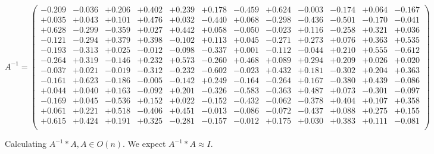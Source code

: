 \documentclass[9pt]{article}
\theoremstyle{plain}
\theoremstyle{definition}
\theoremstyle{remark}
\numberwithin{equation}{section}
\begin{document}
$A^{-1} = \left(
\begin{array}{
cccccccccccc}
-0.209 & -0.036 & +0.206 & +0.402 & +0.239 & +0.178 & -0.459 & +0.624 & -0.003 & -0.174 & +0.064 & -0.167 \\
+0.035 & +0.043 & +0.101 & +0.476 & +0.032 & -0.440 & +0.068 & -0.298 & -0.436 & -0.501 & -0.170 & -0.041 \\
+0.628 & -0.299 & -0.359 & +0.027 & +0.442 & +0.058 & -0.050 & -0.023 & +0.116 & -0.258 & +0.321 & +0.036 \\
-0.121 & -0.294 & +0.379 & +0.398 & -0.102 & +0.113 & +0.045 & -0.271 & +0.273 & +0.076 & +0.363 & +0.535 \\
-0.193 & -0.313 & +0.025 & -0.012 & -0.098 & -0.337 & +0.001 & -0.112 & -0.044 & +0.210 & +0.555 & -0.612 \\
-0.264 & +0.319 & -0.146 & +0.232 & +0.573 & -0.260 & +0.468 & +0.089 & +0.294 & +0.209 & +0.026 & +0.020 \\
-0.037 & +0.021 & -0.019 & -0.312 & -0.232 & -0.602 & -0.023 & +0.432 & +0.181 & -0.302 & +0.204 & +0.363 \\
-0.161 & +0.623 & -0.186 & -0.005 & -0.142 & +0.249 & -0.164 & -0.264 & +0.167 & -0.380 & +0.439 & -0.086 \\
+0.044 & +0.040 & +0.163 & -0.092 & +0.201 & -0.326 & -0.583 & -0.363 & +0.487 & +0.073 & -0.301 & -0.097 \\
-0.169 & +0.045 & -0.536 & +0.152 & +0.022 & -0.152 & -0.432 & -0.062 & -0.378 & +0.404 & +0.107 & +0.358 \\
+0.061 & +0.221 & +0.518 & -0.406 & +0.451 & -0.013 & -0.086 & -0.072 & -0.437 & +0.088 & +0.275 & +0.155 \\
+0.615 & +0.424 & +0.191 & +0.325 & -0.281 & -0.157 & -0.012 & +0.175 & +0.030 & +0.383 & +0.111 & -0.081 \\
\end{array}
\right)$ \newline 

Calculating $A^{-1} *A  ,  A \in O(n)$.   We expect $A^{-1} *A  \approx I$. 
\end{document}
